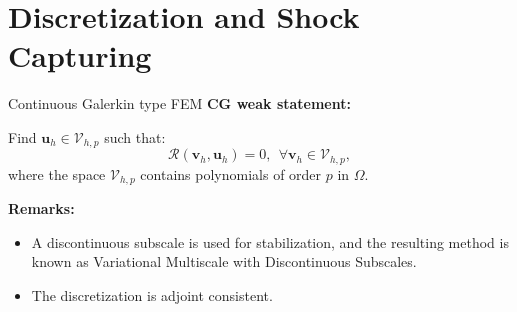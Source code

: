 \documentclass{beamer}
\newcounter{sectionframes}
\newcommand{\setsectionframes}[1]{%
  \setcounter{sectionframes}{#1}%
}
\newcounter{sectionframecount}
\begin{document}
\section{Discretization and Shock Capturing}

\setsectionframes{5}


\begin{frame}[t]{Continuous Galerkin type FEM}
  \textbf{CG weak statement:}

  \vspace{10pt}
  Find $\boldsymbol{u}_{h} \in \mathcal{V}_{h,p}$ such that:
  \begin{equation}
    \mathcal{R}(\boldsymbol{v}_{h},\boldsymbol{u}_{h}) = 0,~~\forall \boldsymbol{v}_{h} \in \mathcal{V}_{h,p},
    \label{e:multiscale_weak_statement}
  \end{equation}
  where the space $\mathcal{V}_{h,p}$ contains polynomials of order $p$ in $\Omega$.

  {
  \vspace{10pt}
  \textbf{Remarks:}
  \begin{itemize}
    \item A discontinuous subscale is used for stabilization, and the resulting method is known as Variational Multiscale with Discontinuous Subscales.
    \item The discretization is adjoint consistent.
  \end{itemize}
  }

\end{frame}

\end{document}
